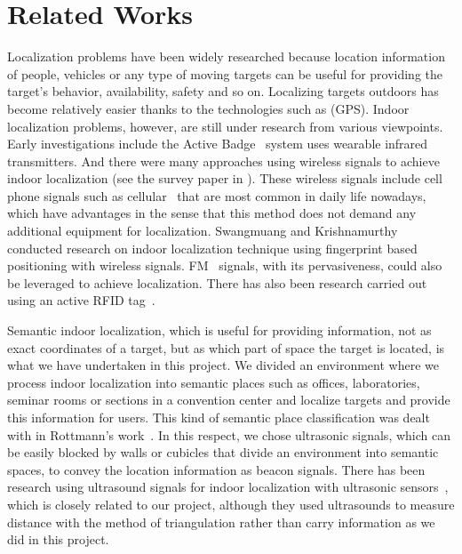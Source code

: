 \section{Related Works}
\label{sec:related-works}

Localization problems have been widely researched because location information of people, vehicles or any type of moving targets can be useful for providing the target's behavior, availability, safety and so on. Localizing targets outdoors has become relatively easier thanks to the technologies such as (GPS). Indoor localization problems, however, are still under research from various viewpoints. Early investigations include the Active Badge~\cite{want1992active} system uses wearable infrared transmitters. And there were many approaches using wireless signals to achieve indoor localization (see the survey paper in \cite{liu2007}). These wireless signals include cell phone signals such as cellular~\cite{otsason2005accurate} that are most common in daily life nowadays, which have advantages in the sense that this method does not demand any additional equipment for localization. Swangmuang and Krishnamurthy~\cite{Swangmuang2008} conducted research on indoor localization technique using fingerprint based positioning with wireless signals. FM~\cite{chen2012fm} signals, with its pervasiveness, could also be leveraged to achieve localization. There has also been research carried out using an active RFID tag~\cite{Jin2006, buettner2009recognizing}.

Semantic indoor localization, which is useful for providing information, not as exact coordinates of a target, but as which part of space the target is located, is what we have undertaken in this project. We divided an environment where we process indoor localization into semantic places such as offices, laboratories, seminar rooms or sections in a convention center and localize targets and provide this information for users. This kind of semantic place classification was dealt with in Rottmann's work~\cite{rottmann2005semantic}. In this respect, we chose ultrasonic signals, which can be easily blocked by walls or cubicles that divide an environment into semantic spaces, to convey the location information as beacon signals. There has been research using ultrasound signals for indoor localization with ultrasonic sensors~\cite{feng1997mobile, priyantha2005cricket}, which is closely related to our project, although they used ultrasounds to measure distance with the method of triangulation rather than carry information as we did in this project.



